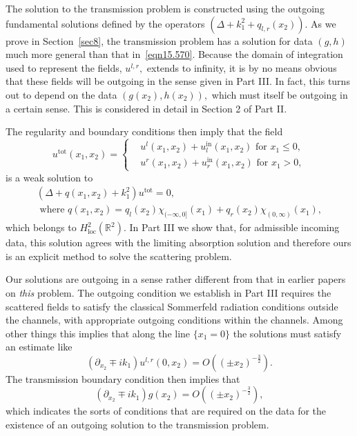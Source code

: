 \documentclass[11pt]{article}
\newcommand{\Bk}{\color{black}}
\newcommand\loc{\operatorname{loc}}
\newcommand\tot{\operatorname{tot}}\newcommand\scat{\operatorname{sc}}
\newcommand\In{\operatorname{in}}
\newcommand\bbR{\mathbb R}
\newcommand\pa{\partial}
\theoremstyle{definition}
\theoremstyle{remark}
\begin{document}
The solution to the transmission problem is constructed using the outgoing
fundamental solutions defined by the operators $(\Delta+k_1^2+q_{l,r}(x_2)).$ As
we prove in Section~\ref{sec8}, the transmission problem has a solution for data $(g,h)$ much
more general than that in~\eqref{eqn15.570}.
Because the domain of integration used to represent the fields, $u^{l,r},$
extends to infinity, it is by no means obvious that these fields will be
outgoing in the sense given in Part III. In fact, this turns out to depend on
the data $(g(x_2),h(x_2)),$ which must itself be outgoing in a certain
sense. This is considered in detail in Section 2 of Part II.\Bk

The regularity and boundary conditions then  imply that  the field
\begin{equation}
  u^{\tot}(x_1,x_2)=
  \begin{cases} &u^l(x_1,x_2)+u^{\In}_l(x_1,x_2)\text{ for }x_1\leq 0,\\
  &u^r(x_1,x_2)+u^{\In}_r(x_1,x_2)\text{ for }x_1>0,
  \end{cases}
\end{equation}
is a weak solution to
\begin{multline}\label{eqn14.702}
  (\Delta+q(x_1,x_2)+k_1^2)u^{\tot}=0,\\\text{ where }q(x_1,x_2)=
  q_l(x_2)\chi_{(-\infty,0]}(x_1)+q_r(x_2)\chi_{(0,\infty)}(x_1),
\end{multline}
which belongs to $H^2_{\loc}(\bbR^2).$ In Part III we show that, for admissible
incoming data, this solution agrees with the limiting absorption solution  and
therefore ours is an explicit method to solve the scattering problem.


Our solutions are outgoing in a sense rather different from that in earlier
papers on {\em this} problem. The outgoing condition we establish in Part III requires the scattered
fields to satisfy the classical Sommerfeld radiation conditions outside
the channels, with appropriate outgoing conditions within the channels. Among
other things this implies that along the line $\{x_1=0\}$ the solutions must
satisfy an estimate like
\begin{equation}
  (\pa_{x_2}\mp ik_1)u^{l,r}(0,x_2)=O((\pm x_2)^{-\frac 32}).
\end{equation}
The transmission boundary condition then implies that
\begin{equation}\label{eqn14.300}
    (\pa_{x_2}\mp ik_1)g(x_2)=O((\pm x_2)^{-\frac 32}),
\end{equation}
which indicates the sorts of conditions that are required on the data for the
existence of an outgoing solution to the transmission problem. 
\end{document}

